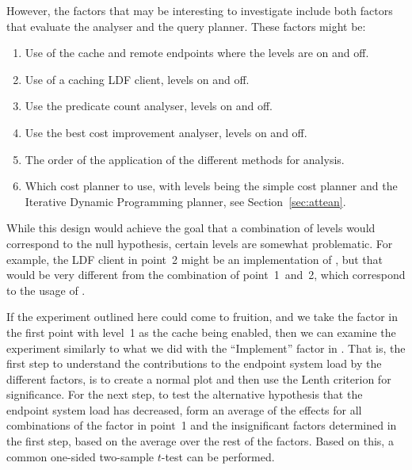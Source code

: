 However, the factors that may be interesting to investigate include
both factors that evaluate the analyser and the query planner. These
factors might be:

\begin{enumerate}
\item Use of the cache and remote endpoints where the levels are on
  and off.
\item Use of a caching LDF client, levels on and
  off.
\item Use the predicate count analyser, levels on and off.
\item Use the best cost improvement analyser, levels on and off.
\item The order of the application of the different methods for
  analysis.
\item Which cost planner to use, with levels being the simple cost
  planner and the Iterative Dynamic Programming planner, see
  Section~\ref{sec:attean}.
\end{enumerate}

While this design would achieve the goal that a combination of levels
would correspond to the null hypothesis, certain levels are somewhat
problematic. For example, the LDF client in point~2
might be an implementation of \cite{verborgh2014querying}, but that
would be very different from the combination of point~1~and~2, which
correspond to the usage of
. 

If the experiment outlined here could come to fruition, and we take
the factor in the first point with level~1 as the cache being enabled,
then we can examine the experiment similarly to what we did with the
``Implement'' factor in \cite{kjernsmo_doe_intro}. That is, the first
step to understand the contributions to the endpoint system load by
the different factors, is to create a normal plot and then use the
Lenth criterion for significance. For the next step, to test the
alternative hypothesis that the endpoint system load has decreased,
form an average of the effects for all combinations of the factor in
point~1 and the insignificant factors determined in the first step,
based on the average over the rest of the factors. Based on this, a
common one-sided two-sample $t$-test can be performed.


